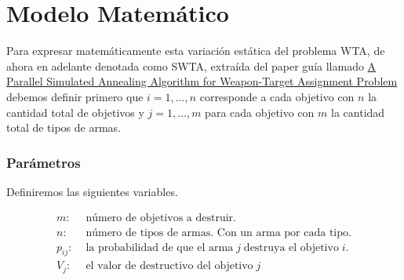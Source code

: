\section{Modelo Matem\'atico}


Para expresar matemáticamente esta variación estática del problema WTA, de ahora en adelante denotada como SWTA, extraída del paper guía llamado  \href{https://web.karabuk.edu.tr/emrullahsonuc/wta/A_Parallel_Simulated_Annealing_Algorithm_for_Weapon-Target_Assignment_Problem.pdf}{A Parallel Simulated Annealing Algorithm for Weapon-Target Assignment Problem}
  debemos definir primero que $i = 1, \dots , n$ corresponde a cada objetivo con $n$ la cantidad total de objetivos y $j = 1, \dots , m$ para cada objetivo con $m$ la cantidad total de tipos de armas.


\subsubsection{Parámetros}
Definiremos las siguientes variables.

\begin{align*}
    m :& \text{ número de objetivos a destruir.} \\
    n :& \text{ número de tipos de armas. Con un arma por cada tipo.} \\
    p_{ij}:& \text{ la probabilidad de que el arma} \; j \; \text{destruya el objetivo} \; i. \\
    V_j :& \text{ el valor de destructivo del objetivo} \; j \\
\end{align*}

